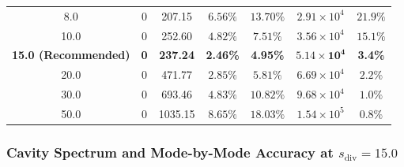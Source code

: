\documentclass[preprint,12pt]{elsarticle}
\begin{document}
\begin{table}[!t]
{\begin{tabular}{ccccccc}
            8.0                             & 0                     & 207.15                                      & $6.56\%$                                             & $13.70\%$                                           & $2.91 \times 10^4$                                      & $21.9\%$                                                   \\
            10.0                            & 0                     & 252.60                                      & $4.82\%$                                             & $7.51\%$                                            & $3.56 \times 10^4$                                      & $15.1\%$                                                   \\
            \textbf{15.0 (Recommended)}     & \textbf{0}            & \textbf{237.24}                             & \textbf{2.46\%}                                      & \textbf{4.95\%}                                     & $\mathbf{5.14 \times 10^4}$                             & \textbf{3.4\%}                                             \\
            20.0                            & 0                     & 471.77                                      & $2.85\%$                                             & $5.81\%$                                            & $6.69 \times 10^4$                                      & $2.2\%$                                                    \\
            30.0                            & 0                     & 693.46                                      & $4.83\%$                                             & $10.82\%$                                           & $9.68 \times 10^4$                                      & $1.0\%$                                                    \\
            50.0                            & 0                     & 1035.15                                     & $8.65\%$                                             & $18.03\%$                                           & $1.54 \times 10^5$                                      & $0.8\%$                                                    \\
            \bottomrule
        \end{tabular}
    }
\end{table}

\subsubsection{Cavity Spectrum and Mode-by-Mode Accuracy at $s_{\mathrm{div}} = 15.0$}
\label{subsubsec:cavity_modes_15}
\end{document}
